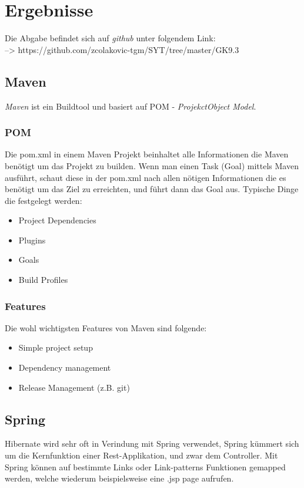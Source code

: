 
\section{Ergebnisse}
    Die Abgabe befindet sich auf \textit{github} unter folgendem Link: \\ --> https://github.com/zcolakovic-tgm/SYT/tree/master/GK9.3
    
    \subsection{Maven}
        \textit{Maven} ist ein Buildtool und basiert auf POM - \textit{ProjekctObject Model}.
        
        \subsubsection{POM}
            Die pom.xml in einem Maven Projekt beinhaltet alle Informationen die Maven benötigt um das Projekt zu builden. Wenn man einen Task (Goal) mittels Maven ausführt, schaut diese in der pom.xml nach allen nötigen Informationen die es benötigt um das Ziel zu erreichten, und führt dann das Goal aus. Typische Dinge die festgelegt werden: 
            \begin{itemize}
                \item Project Dependencies 
                \item Plugins 
                \item Goals 
                \item Build Proﬁles 
            \end{itemize}
            
        \subsubsection{Features}
            Die wohl wichtigsten Features von Maven sind folgende:
            \begin{itemize}
                \item Simple project setup
                \item Dependency management
                \item Release Management (z.B. git)
            \end{itemize}
            
    \subsection{Spring}
        Hibernate wird sehr oft in Verindung mit Spring verwendet, Spring kümmert sich um die Kernfunktion einer Rest-Applikation, und zwar dem Controller. Mit Spring können auf bestimmte Links oder Link-patterns Funktionen gemapped werden, welche wiederum beispielsweise eine .jsp page aufrufen.
        
